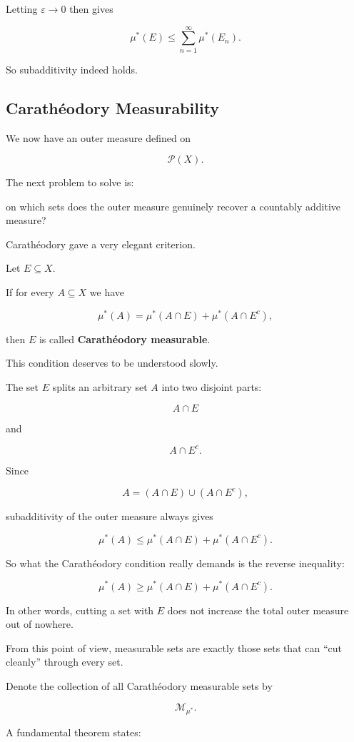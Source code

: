 \documentclass[11pt]{article}
\begin{document}
Letting $\varepsilon\rightarrow0$ then gives

\[
\mu^{*}(E)\leq\sum_{n=1}^{\infty}\mu^{*}(E_{n}).
\]

So subadditivity indeed holds.

\subsection{Carathéodory Measurability}

We now have an outer measure defined on

\[
\mathcal{P}(X).
\]

The next problem to solve is:

on which sets does the outer measure genuinely recover a countably additive measure?

Carathéodory gave a very elegant criterion.

Let $E\subseteq X$.

If for every $A\subseteq X$ we have

\[
\mu^{*}(A)=\mu^{*}(A\cap E)+\mu^{*}(A\cap E^{c}),
\]

then $E$ is called \textbf{Carathéodory measurable}.

This condition deserves to be understood slowly.

The set $E$ splits an arbitrary set $A$ into two disjoint parts:

\[
A\cap E
\]

and

\[
A\cap E^{c}.
\]

Since

\[
A=(A\cap E)\cup(A\cap E^{c}),
\]

subadditivity of the outer measure always gives

\[
\mu^{*}(A)\leq\mu^{*}(A\cap E)+\mu^{*}(A\cap E^{c}).
\]

So what the Carathéodory condition really demands is the reverse inequality:

\[
\mu^{*}(A)\geq\mu^{*}(A\cap E)+\mu^{*}(A\cap E^{c}).
\]

In other words, cutting a set with $E$ does not increase the total outer measure out of nowhere.

From this point of view, measurable sets are exactly those sets that can ``cut cleanly'' through every set.

Denote the collection of all Carathéodory measurable sets by

\[
\mathcal{M}_{\mu^{*}}.
\]

A fundamental theorem states:
\end{document}
